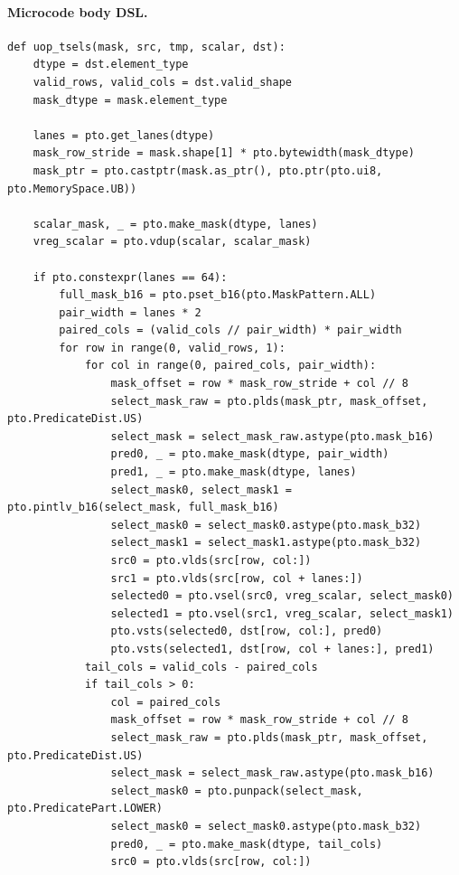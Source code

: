 \paragraph{Microcode body DSL.}
\begin{lstlisting}[style=ptocode]
def uop_tsels(mask, src, tmp, scalar, dst):
    dtype = dst.element_type
    valid_rows, valid_cols = dst.valid_shape
    mask_dtype = mask.element_type

    lanes = pto.get_lanes(dtype)
    mask_row_stride = mask.shape[1] * pto.bytewidth(mask_dtype)
    mask_ptr = pto.castptr(mask.as_ptr(), pto.ptr(pto.ui8, pto.MemorySpace.UB))

    scalar_mask, _ = pto.make_mask(dtype, lanes)
    vreg_scalar = pto.vdup(scalar, scalar_mask)

    if pto.constexpr(lanes == 64):
        full_mask_b16 = pto.pset_b16(pto.MaskPattern.ALL)
        pair_width = lanes * 2
        paired_cols = (valid_cols // pair_width) * pair_width
        for row in range(0, valid_rows, 1):
            for col in range(0, paired_cols, pair_width):
                mask_offset = row * mask_row_stride + col // 8
                select_mask_raw = pto.plds(mask_ptr, mask_offset, pto.PredicateDist.US)
                select_mask = select_mask_raw.astype(pto.mask_b16)
                pred0, _ = pto.make_mask(dtype, pair_width)
                pred1, _ = pto.make_mask(dtype, lanes)
                select_mask0, select_mask1 = pto.pintlv_b16(select_mask, full_mask_b16)
                select_mask0 = select_mask0.astype(pto.mask_b32)
                select_mask1 = select_mask1.astype(pto.mask_b32)
                src0 = pto.vlds(src[row, col:])
                src1 = pto.vlds(src[row, col + lanes:])
                selected0 = pto.vsel(src0, vreg_scalar, select_mask0)
                selected1 = pto.vsel(src1, vreg_scalar, select_mask1)
                pto.vsts(selected0, dst[row, col:], pred0)
                pto.vsts(selected1, dst[row, col + lanes:], pred1)
            tail_cols = valid_cols - paired_cols
            if tail_cols > 0:
                col = paired_cols
                mask_offset = row * mask_row_stride + col // 8
                select_mask_raw = pto.plds(mask_ptr, mask_offset, pto.PredicateDist.US)
                select_mask = select_mask_raw.astype(pto.mask_b16)
                select_mask0 = pto.punpack(select_mask, pto.PredicatePart.LOWER)
                select_mask0 = select_mask0.astype(pto.mask_b32)
                pred0, _ = pto.make_mask(dtype, tail_cols)
                src0 = pto.vlds(src[row, col:])

\end{lstlisting}
